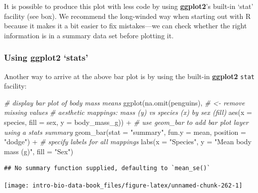 \documentclass[
]{book}
\newenvironment{Shaded}{\begin{snugshade}}{\end{snugshade}}
\newcommand{\AttributeTok}[1]{\textcolor[rgb]{0.77,0.63,0.00}{#1}}
\newcommand{\CommentTok}[1]{\textcolor[rgb]{0.56,0.35,0.01}{\textit{#1}}}
\newcommand{\FunctionTok}[1]{\textcolor[rgb]{0.00,0.00,0.00}{#1}}
\newcommand{\NormalTok}[1]{#1}
\newcommand{\SpecialCharTok}[1]{\textcolor[rgb]{0.00,0.00,0.00}{#1}}
\newcommand{\StringTok}[1]{\textcolor[rgb]{0.31,0.60,0.02}{#1}}
\newenvironment{greybox}{
  \definecolor{shadecolor}{rgb}{0.95,0.95,0.95}  %
  \color{black}
  \begin{shaded}}
 {\end{shaded}}
\newenvironment{infobox}[1]
  {
  \begin{itemize}
  \renewcommand{\labelitemi}{
    \raisebox{-.7\height}[0pt][0pt]{
      {\setkeys{Gin}{width=3em,keepaspectratio}
        \texttt{[image: images/\#1]}}
    }
  }
  \setlength{\fboxsep}{1em}
  \begin{greybox}
  \item
  }
  {
  \end{greybox}
  \end{itemize}
  }
\begin{document}
It is possible to produce this plot with less code by using \textbf{ggplot2}'s built-in `stat' facility (see box). We recommend the long-winded way when starting out with R because it makes it a bit easier to fix mistakes---we can check whether the right information is in a summary data set before plotting it.

\begin{infobox}{information}

\hypertarget{using-ggplot2-stats}{%
\subsubsection*{\texorpdfstring{Using \textbf{ggplot2} `stats'}{Using ggplot2 `stats'}}\label{using-ggplot2-stats}}

Another way to arrive at the above bar plot is by using the built-in \textbf{ggplot2} \texttt{stat} facility:

\begin{Shaded}
\begin{Highlighting}[]
\CommentTok{\# display bar plot of body mass means}
\FunctionTok{ggplot}\NormalTok{(}\FunctionTok{na.omit}\NormalTok{(penguins), }\CommentTok{\# \textless{}{-} remove missing values}
       \CommentTok{\# aesthetic mappings: mass (y) vs species (x) by sex (fill)}
       \FunctionTok{aes}\NormalTok{(}\AttributeTok{x =}\NormalTok{ species, }\AttributeTok{fill =}\NormalTok{ sex, }\AttributeTok{y =}\NormalTok{ body\_mass\_g)) }\SpecialCharTok{+}
  \CommentTok{\# use geom\_bar to add bar plot layer using a stats summary}
  \FunctionTok{geom\_bar}\NormalTok{(}\AttributeTok{stat =} \StringTok{"summary"}\NormalTok{, }\AttributeTok{fun.y =}\NormalTok{ mean, }\AttributeTok{position =} \StringTok{"dodge"}\NormalTok{) }\SpecialCharTok{+}
  \CommentTok{\# specify labels for all mappings}
  \FunctionTok{labs}\NormalTok{(}\AttributeTok{x =} \StringTok{"Species"}\NormalTok{, }\AttributeTok{y =} \StringTok{"Mean body mass (g)"}\NormalTok{, }\AttributeTok{fill =} \StringTok{"Sex"}\NormalTok{)}
\end{Highlighting}
\end{Shaded}

\begin{verbatim}
## No summary function supplied, defaulting to `mean_se()`
\end{verbatim}

\begin{center}\texttt{[image: intro-bio-data-book\_files/figure-latex/unnamed-chunk-262-1]} \end{center}


\end{infobox}
\end{document}
